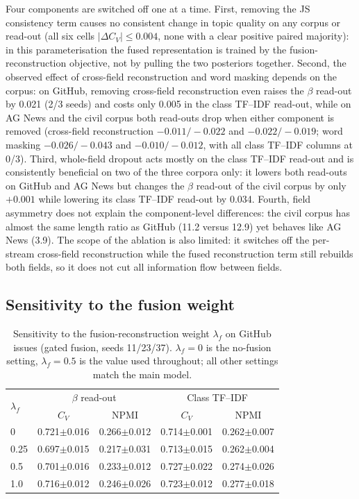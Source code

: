 \documentclass[11pt]{article}
\begin{document}
Four components are switched off one at a time. First, removing the JS consistency term causes no
consistent change in topic quality on any corpus or read-out (all six cells
$|\Delta C_V|\leq0.004$, none with a clear positive paired majority): in this
parameterisation the fused representation is trained by the fusion-reconstruction objective, not by
pulling the two posteriors together. Second, the observed effect of cross-field reconstruction
and word masking depends on the corpus: on GitHub, removing cross-field reconstruction even raises
the $\beta$ read-out by 0.021 (2/3 seeds) and costs only 0.005 in the class TF--IDF read-out, while
on AG News and the civil corpus both read-outs drop when either component is removed (cross-field
reconstruction $-0.011/-0.022$ and $-0.022/-0.019$; word masking $-0.026/-0.043$ and
$-0.010/-0.012$, with all class TF--IDF columns at 0/3). Third, whole-field dropout acts mostly on
the class TF--IDF read-out and is consistently beneficial on two of the three corpora only: it
lowers both read-outs on GitHub
and AG News but changes the $\beta$ read-out of the civil corpus by only $+0.001$ while lowering
its class TF--IDF read-out by 0.034. Fourth, field asymmetry does not explain the component-level
differences: the civil corpus has almost the same length ratio as GitHub (11.2 versus 12.9) yet
behaves like AG News (3.9). The scope of the ablation is also limited: it switches off the
per-stream cross-field reconstruction while the fused reconstruction term still rebuilds both
fields, so it does not cut all information flow between fields.

\subsection{Sensitivity to the fusion weight}

\begin{table}[t]
\centering
\caption{Sensitivity to the fusion-reconstruction weight $\lambda_f$ on GitHub issues (gated fusion, seeds 11/23/37). $\lambda_f=0$ is the no-fusion setting, $\lambda_f=0.5$ is the value used throughout; all other settings match the main model.}
\label{tab:weight}
\small
\setlength{\tabcolsep}{4pt}
\begin{tabular}{lcccc}
\toprule
\multirow{2}{*}{$\lambda_f$} & \multicolumn{2}{c}{$\beta$ read-out} & \multicolumn{2}{c}{Class TF--IDF} \\
 & $C_V$ & NPMI & $C_V$ & NPMI \\
\midrule
0 & 0.721$\pm$0.016 & 0.266$\pm$0.012 & 0.714$\pm$0.001 & 0.262$\pm$0.007 \\
0.25 & 0.697$\pm$0.015 & 0.217$\pm$0.031 & 0.713$\pm$0.015 & 0.262$\pm$0.004 \\
0.5 & 0.701$\pm$0.016 & 0.233$\pm$0.012 & 0.727$\pm$0.022 & 0.274$\pm$0.026 \\
1.0 & 0.716$\pm$0.012 & 0.246$\pm$0.026 & 0.723$\pm$0.012 & 0.277$\pm$0.018 \\
\bottomrule
\end{tabular}
\end{table}
\end{document}
